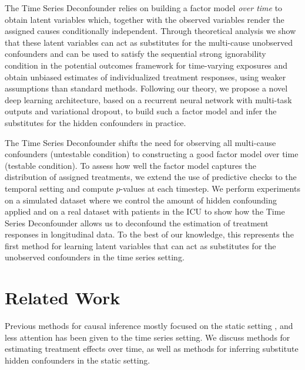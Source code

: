 \documentclass{article}
\begin{document}
	The Time Series Deconfounder relies on building a factor model \textit{over time} to obtain latent variables which, together with the observed variables render the assigned causes conditionally independent. Through theoretical analysis we show that these latent variables can act as substitutes for the multi-cause unobserved confounders and can be used to satisfy the sequential strong ignorability condition in the potential outcomes framework for time-varying exposures \citep{robins2008estimation} and obtain unbiased estimates of individualized treatment responses, using weaker assumptions than standard methods. Following our theory, we propose a novel deep learning architecture, based on a recurrent neural network with multi-task outputs and variational dropout, to build such a factor model and infer the substitutes for the hidden confounders in practice. 
	
	The Time Series Deconfounder shifts the need for observing all multi-cause confounders (untestable condition) to constructing a good factor model over time (testable condition). To assess how well the factor model captures the distribution of assigned treatments, we extend the use of predictive checks \citep{rubin1984bayesianly, wang2018blessings} to the temporal setting and compute $p$-values at each timestep. We perform experiments on a simulated dataset where we control the amount of hidden confounding applied and on a real dataset with patients in the ICU \citep{johnson2016mimic} to  show how the Time Series Deconfounder allows us to deconfound the estimation of treatment responses in longitudinal data. To the best of our knowledge, this represents the first method for learning latent variables that can act as substitutes for the unobserved confounders in the time series setting.
	
	\section{Related Work}
	
	Previous methods for causal inference mostly focused on the static setting \citep{hill2011bayesian, wager2017estimation, alaa2017bayesian, shalit2017estimating,  yoon2018ganite, alaa2018limits,zhang2020learning, bica2020estimatingdose}, and less attention has been given to the time series setting.  We discuss methods for estimating treatment effects over time, as well as methods for inferring substitute hidden confounders in the static setting. 
	
\end{document}
